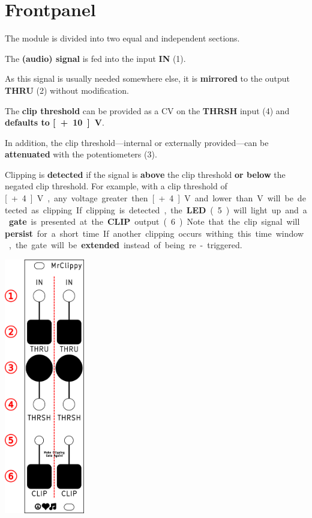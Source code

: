 \documentclass[a4paper,
               11pt,
               parskip=half,
               headinclude,
               titlepage=false]{scrartcl}
\begin{document}
\begin{minipage}[]{11cm}
\setlength{\parskip}{\medskipamount}
\section*{Frontpanel}

The module is divided into two equal and independent sections.

The \textbf{(audio) signal} is fed into the input \textbf{\color{red}IN} (1).

As this signal is usually needed somewhere else, it is \textbf{mirrored} to the output \textbf{\color{red}THRU} (2) without modification.

\vspace{1em}

The \textbf{clip threshold} can be provided as a CV on the \textbf{\color{red}THRSH} input (4) and \textbf{defaults to \unit[+10]{V}}.

In addition, the clip threshold---internal or externally provided---can be \textbf{attenuated} with the potentiometers (3).

\vspace{1em}

Clipping is \textbf{detected} if the signal is \textbf{above} the clip threshold \textbf{or below} the negated clip threshold.
For example, with a clip threshold of \unit[+4]{V}, any voltage greater then \unit[+4]{V} and lower than \unit[-4]{V} will be detected as clipping.

If clipping is detected, the \textbf{\color{red}LED} (5) will light up and a \textbf{gate} is presented at the \textbf{\color{red}CLIP} output (6).

Note that the clip signal will \textbf{persist} for a short time. If another clipping occurs withing this time window, the gate will be \textbf{extended} instead of being re-triggered.

\end{minipage}%
\hspace{0.5cm}
\begin{minipage}[]{3.5cm}
\includegraphics[width=3.5cm]{MisterClippy-frontpanel-labels}
\end{minipage}
\end{document}

